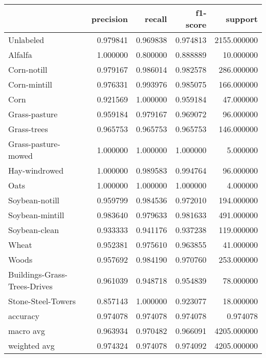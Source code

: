 \begin{tabular}{lrrrr}
\toprule
{} &  precision &    recall &  f1-score &      support \\
\midrule
Unlabeled                    &   0.979841 &  0.969838 &  0.974813 &  2155.000000 \\
Alfalfa                      &   1.000000 &  0.800000 &  0.888889 &    10.000000 \\
Corn-notill                  &   0.979167 &  0.986014 &  0.982578 &   286.000000 \\
Corn-mintill                 &   0.976331 &  0.993976 &  0.985075 &   166.000000 \\
Corn                         &   0.921569 &  1.000000 &  0.959184 &    47.000000 \\
Grass-pasture                &   0.959184 &  0.979167 &  0.969072 &    96.000000 \\
Grass-trees                  &   0.965753 &  0.965753 &  0.965753 &   146.000000 \\
Grass-pasture-mowed          &   1.000000 &  1.000000 &  1.000000 &     5.000000 \\
Hay-windrowed                &   1.000000 &  0.989583 &  0.994764 &    96.000000 \\
Oats                         &   1.000000 &  1.000000 &  1.000000 &     4.000000 \\
Soybean-notill               &   0.959799 &  0.984536 &  0.972010 &   194.000000 \\
Soybean-mintill              &   0.983640 &  0.979633 &  0.981633 &   491.000000 \\
Soybean-clean                &   0.933333 &  0.941176 &  0.937238 &   119.000000 \\
Wheat                        &   0.952381 &  0.975610 &  0.963855 &    41.000000 \\
Woods                        &   0.957692 &  0.984190 &  0.970760 &   253.000000 \\
Buildings-Grass-Trees-Drives &   0.961039 &  0.948718 &  0.954839 &    78.000000 \\
Stone-Steel-Towers           &   0.857143 &  1.000000 &  0.923077 &    18.000000 \\
accuracy                     &   0.974078 &  0.974078 &  0.974078 &     0.974078 \\
macro avg                    &   0.963934 &  0.970482 &  0.966091 &  4205.000000 \\
weighted avg                 &   0.974324 &  0.974078 &  0.974092 &  4205.000000 \\
\bottomrule
\end{tabular}
